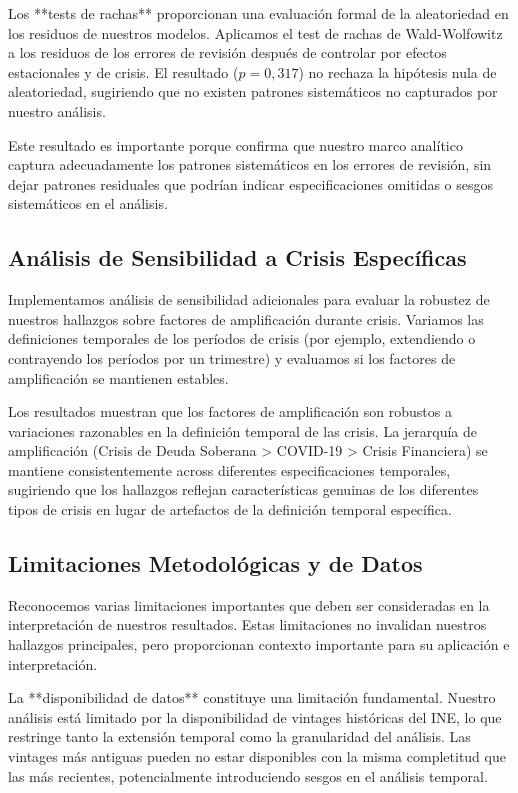 \documentclass[12pt,a4paper]{article}
\begin{document}
Los **tests de rachas** proporcionan una evaluación formal de la aleatoriedad en los residuos de nuestros modelos. Aplicamos el test de rachas de Wald-Wolfowitz a los residuos de los errores de revisión después de controlar por efectos estacionales y de crisis. El resultado ($p = 0,317$) no rechaza la hipótesis nula de aleatoriedad, sugiriendo que no existen patrones sistemáticos no capturados por nuestro análisis.

Este resultado es importante porque confirma que nuestro marco analítico captura adecuadamente los patrones sistemáticos en los errores de revisión, sin dejar patrones residuales que podrían indicar especificaciones omitidas o sesgos sistemáticos en el análisis.

\subsection{Análisis de Sensibilidad a Crisis Específicas}

Implementamos análisis de sensibilidad adicionales para evaluar la robustez de nuestros hallazgos sobre factores de amplificación durante crisis. Variamos las definiciones temporales de los períodos de crisis (por ejemplo, extendiendo o contrayendo los períodos por un trimestre) y evaluamos si los factores de amplificación se mantienen estables.

Los resultados muestran que los factores de amplificación son robustos a variaciones razonables en la definición temporal de las crisis. La jerarquía de amplificación (Crisis de Deuda Soberana > COVID-19 > Crisis Financiera) se mantiene consistentemente across diferentes especificaciones temporales, sugiriendo que los hallazgos reflejan características genuinas de los diferentes tipos de crisis en lugar de artefactos de la definición temporal específica.

\subsection{Limitaciones Metodológicas y de Datos}

Reconocemos varias limitaciones importantes que deben ser consideradas en la interpretación de nuestros resultados. Estas limitaciones no invalidan nuestros hallazgos principales, pero proporcionan contexto importante para su aplicación e interpretación.

La **disponibilidad de datos** constituye una limitación fundamental. Nuestro análisis está limitado por la disponibilidad de vintages históricas del INE, lo que restringe tanto la extensión temporal como la granularidad del análisis. Las vintages más antiguas pueden no estar disponibles con la misma completitud que las más recientes, potencialmente introduciendo sesgos en el análisis temporal.
\end{document}
